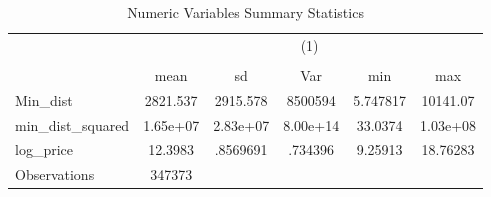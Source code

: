 {
\def\sym#1{\ifmmode^{#1}\else\(^{#1}\)\fi}
\begin{longtable}{l*{1}{ccccc}}
\caption{Numeric Variables Summary Statistics}\\
\toprule\endfirsthead\midrule\endhead\midrule\endfoot\endlastfoot
                    &\multicolumn{5}{c}{(1)}                                         \\
                    &\multicolumn{5}{c}{}                                            \\
                    &        mean&          sd&         Var&         min&         max\\
\midrule
Min\_dist            &    2821.537&    2915.578&     8500594&    5.747817&    10141.07\\
min\_dist\_squared    &    1.65e+07&    2.83e+07&    8.00e+14&     33.0374&    1.03e+08\\
log\_price           &     12.3983&    .8569691&     .734396&     9.25913&    18.76283\\
\midrule
Observations        &      347373&            &            &            &            \\
\bottomrule
\end{longtable}
\label{tab:continuous_summary_stats}
}
